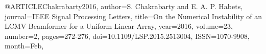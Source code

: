 @ARTICLE{Chakrabarty2016, 
author={S. Chakrabarty and E. A. P. Habets}, 
journal={IEEE Signal Processing Letters}, 
title={On the Numerical Instability of an LCMV Beamformer for a Uniform Linear Array}, 
year={2016}, 
volume={23}, 
number={2}, 
pages={272-276}, 
doi={10.1109/LSP.2015.2513004}, 
ISSN={1070-9908}, 
month={Feb},
}